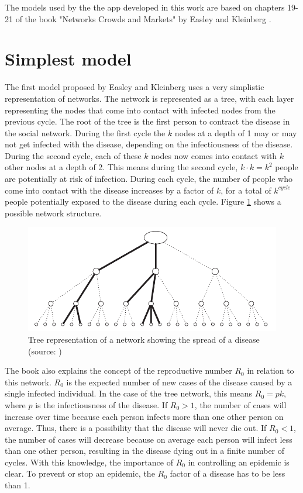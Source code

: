 The models used by the the app developed in this work are based on chapters 19-21 of the book
"Networks Crowds and Markets" by Easley and Kleinberg \cite{networks}.

\section{Simplest model}
The first model proposed by Easley and Kleinberg \cite{networks} uses a very simplistic
representation of networks. The network is represented as a tree, with each layer representing
the nodes that come into contact with infected nodes from the previous cycle. The root
of the tree is the first person to contract the disease in the social network. During the
first cycle the $k$ nodes at a depth of 1 may or may not get infected with the disease, depending
on the infectiousness of the disease. During the second cycle, each of these $k$ nodes
now comes into contact with $k$ other nodes at a depth of 2. This means during the second
cycle, $k \cdot k = k^2$ people are potentially at risk of infection. During each cycle, the
number of people who come into contact with the disease increases by a factor of $k$, for
a total of $k^{cycle}$ people potentially exposed to the disease during each cycle.
Figure \ref{fig:tree_network} shows a possible network structure.

\begin{figure}
    \centering
    \includegraphics[width=0.5\linewidth]{images/network_tree.png}
    \caption{Tree representation of a network showing the spread of a disease (source: \cite{networks})}
    \label{fig:tree_network}
\end{figure}

The book \cite{networks} also explains the concept of the reproductive number $R_0$ in
relation to this network. $R_0$ is the expected number of new cases of the disease
caused by a single infected individual. In the case of the tree network, this means 
$R_0 = pk$, where $p$ is the infectiousness of the disease. If $R_0 > 1$, the number
of cases will increase over time because each person infects more than one other person
on average. Thus, there is a possibility that the disease will never
die out. If $R_0 < 1$, the number of cases will decrease because on average each person will infect less
than one other person, resulting in the disease dying out in a finite number of cycles.
With this knowledge, the importance of $R_0$ in controlling an epidemic is clear. To prevent
or stop an epidemic, the $R_0$ factor of a disease has to be less than 1.

